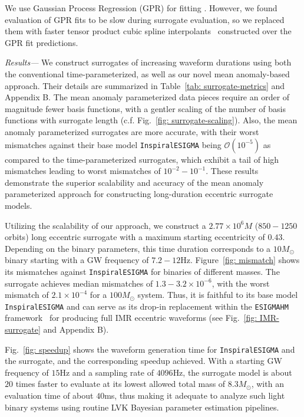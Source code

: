 \documentclass[reprint, superscriptaddress, amsmath, amssymb, aps, prl floatfix]{revtex4-2}
\newcommand{\esigmahm}{\texttt{ESIGMAHM}}
\newcommand{\inspiralesigma}{\texttt{InspiralESIGMA}}
\begin{document}
We use Gaussian Process Regression (GPR) for fitting \cite{Varma:2018aht}. However, we found evaluation of GPR fits to be slow during surrogate evaluation, so we replaced them with faster tensor product cubic spline interpolants~\cite{TPI} constructed over the GPR fit predictions.


\textit{Results---} We construct surrogates of increasing waveform durations using both the conventional time-parameterized, as well as our novel mean anomaly-based approach. Their details are summarized in Table~\ref{tab: surrogate-metrics} and Appendix B. The mean anomaly parameterized data pieces require an order of magnitude fewer basis functions, with a gentler scaling of the number of basis functions with surrogate length (c.f. Fig.~\ref{fig: surrogate-scaling}). Also, the mean anomaly parameterized surrogates are more accurate, with their worst mismatches against their base model \inspiralesigma{} being $\mathcal{O}(10^{-5})$ as compared to the time-parameterized surrogates, which exhibit a tail of high mismatches leading to worst mismatches of $10^{-2}-10^{-1}$. These results demonstrate the superior scalability and accuracy of the mean anomaly parameterized approach for constructing long-duration eccentric surrogate models.

Utilizing the scalability of our approach, we construct a $2.77 \times 10^6M$ ($850-1250$ orbits) long eccentric surrogate with a maximum starting eccentricity of $0.43$. Depending on the binary parameters, this time duration corresponds to a $10M_\odot$ binary starting with a GW frequency of $7.2-12$Hz. Figure~\ref{fig: mismatch} shows its mismatches against \inspiralesigma{} for binaries of different masses. The surrogate achieves median mismatches of $1.3-3.2 \times 10^{-6}$, with the worst mismatch of $2.1 \times 10^{-4}$ for a $100M_\odot$ system. Thus, it is faithful to its base model \inspiralesigma{} and can serve as its drop-in replacement within the \esigmahm{} framework~\citep{Paul:2024ujx, esigmapy} for producing full IMR eccentric waveforms (see Fig.~\ref{fig: IMR-surrogate} and Appendix B).   

Fig.~\ref{fig: speedup} shows the waveform generation time for \inspiralesigma{} and the surrogate, and the corresponding speedup achieved. With a starting GW frequency of $15$Hz and a sampling rate of $4096$Hz, the surrogate model is about $20$ times faster to evaluate at its lowest allowed total mass of $8.3M_\odot$, with an evaluation time of about $40$ms, thus making it adequate to analyze such light binary systems using routine LVK Bayesian parameter estimation pipelines.  
\end{document}
